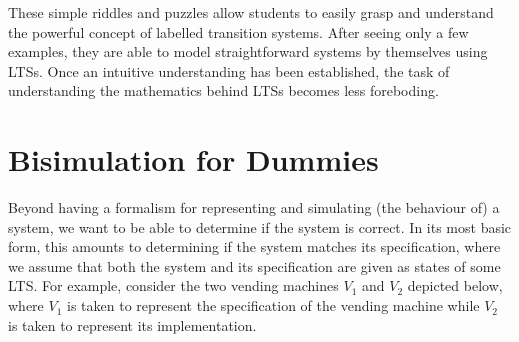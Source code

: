 \documentclass[sigconf]{acmart}
\begin{document}
These simple riddles and puzzles allow students to easily grasp and
understand the powerful concept of labelled transition systems. After
seeing only a few examples, they are able to model straightforward
systems by themselves using LTSs. Once an intuitive understanding has
been established, the task of understanding the mathematics behind
LTSs becomes less foreboding.

\section{Bisimulation for Dummies}

Beyond having a formalism for representing and simulating (the
behaviour of) a system, we want to be able to determine if the system
is correct.  In its most basic form, this amounts to determining if
the system matches its specification, where we assume that both the
system and its specification are given as states of some LTS.  For
example, consider the two vending machines $V_1$ and $V_2$ depicted
below, where $V_1$ is taken to represent the specification of the
vending machine while $V_2$ is taken to represent its implementation.
\end{document}
